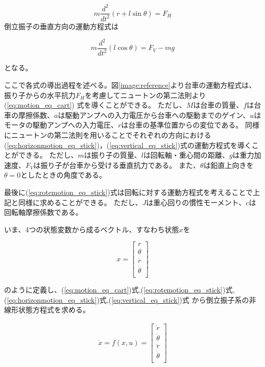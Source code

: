	\begin{equation}
		m\frac{d^{2}}{dt^{2}}(r+l\sin\theta) = F_{H}
		\label{eq:horizonmotion_eq_stick}
	\end{equation}
	倒立振子の垂直方向の運動方程式は
	
	\begin{equation}
		m\frac{d^{2}}{dt^{2}}(l\cos\theta) = F_{V}-mg
		\label{eq:vertical_eq_stick}
	\end{equation}
	
	となる。
	\par
	ここで各式の導出過程を述べる。図\ref{image:reference}より台車の運動方程式は、振り子からの水平抗力$F_{H}$を考慮してニュートンの第二法則より(\ref{eq:motion_eq_cart})
	式を導くことができる。
	ただし、$M$は台車の質量、$f$は台車の摩擦係数、$a$は駆動アンプへの入力電圧から台車への駆動までのゲイン、$u$はモータの駆動アンプへの入力電圧、$r$は台車の基準位置からの変位である。
	同様にニュートンの第二法則を用いることでそれぞれの方向における(\ref{eq:horizonmotion_eq_stick})，(\ref{eq:vertical_eq_stick})式の運動方程式を導くことができる。
	ただし、$m$は振り子の質量、$l$は回転軸・重心間の距離、$g$は重力加速度、$F_{V}$は振り子が台車から受ける垂直抗力である。
	また、$\theta$は鉛直上向きを$\theta=0$としたときの角度である。
	\par
	最後に(\ref{eq:rotemotion_eq_stick})式は回転に対する運動方程式を考えることで上記と同様に求めることができる。
	ただし、$J$は重心回りの慣性モーメント、$c$は回転軸摩擦係数である。
	\par
	いま、4つの状態変数から成るベクトル、すなわち状態$x$を
					
	\[
		x=\left[
		\begin{array}{ccc}
			r\\
			\theta\\
			\dot{r}\\
			\dot{\theta}\\
		\end{array}
		\right]
		\label{eq:array1}
	\]
					
	のように定義し、(\ref{eq:motion_eq_cart})式,(\ref{eq:rotemotion_eq_stick})式,(\ref{eq:horizonmotion_eq_stick})式,(\ref{eq:vertical_eq_stick})式
	から倒立振子系の非線形状態方程式を求める。
	
	\begin{eqnarray}
		\dot{x} = f(x,u) = \left[
		\begin{array}{ccc}
			\dot{r}\\
			\dot{\theta}\\
			\ddot{r}\\
			\ddot{\theta}\\
		\end{array}
		\right]
		\label{eq:array2}
	\end{eqnarray}
					
